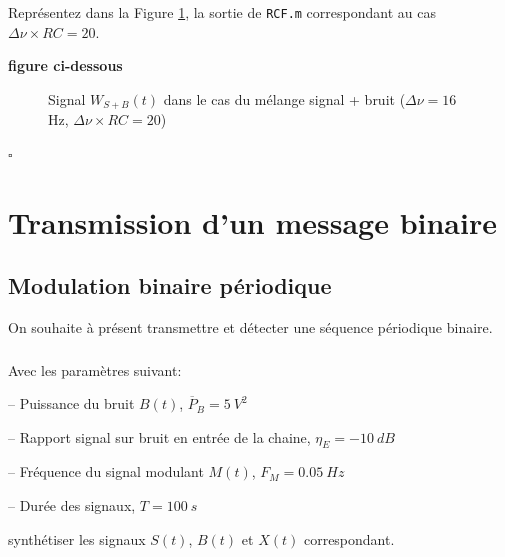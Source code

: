 \documentclass{article}
\newcommand{\debutrep}[1]{\color{blue}\begin{center} \hrulefill \textbf{ #1 } \hrulefill \end{center} }
\newcommand{\finrep}{\vspace*{5mm}\hfill $\square$\color{black}\vspace*{5mm}}
\begin{document}
\subsubsection{}

Représentez dans la Figure \ref{fig-Wsb}, la sortie de {\tt RCF.m} correspondant au cas  $\Delta\nu \times RC = 20$.

\debutrep{figure ci-dessous}
\begin{figure}[h]

\caption{Signal $W_{S+B}(t)$ dans le cas du mélange signal + bruit ($\Delta \nu = 16$ Hz, $\Delta\nu \times RC = 20$)}
\label{fig-Wsb}
\end{figure}
\finrep

\clearpage

\section{Transmission d'un message binaire}

\subsection{Modulation binaire périodique}

On souhaite à présent transmettre et détecter une séquence périodique binaire.\\

\subsubsection{}

Avec les paramètres suivant:\\[-3mm]
\begin{list}{-}{\setlength{\leftmargin}{3mm} \setlength{\labelwidth}{20mm} \setlength{\labelsep}{2mm} \setlength{\itemsep}{1mm} }
\item[--] Puissance du bruit $B(t)$, $\overline{P}_{B}  = 5~V^2$
\item[--] Rapport signal sur bruit en entrée de la chaine, $\eta_E = -10~dB$
\item[--] Fréquence du signal modulant $M(t)$, $F_M = 0.05~Hz$
\item[--] Durée des signaux, $T = 100~s$\\[-2mm]
\end{list}

synthétiser les  signaux $S(t)$,  $B(t)$ et $X(t)$ correspondant. \\
\end{document}
